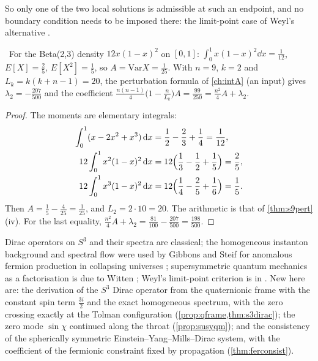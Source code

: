 So only one of the two local solutions is admissible at such an endpoint, and no boundary condition needs to be imposed there: the limit-point case of Weyl's alternative \cite{Weidmann}.

\begin{proposition}\label{prop:ninetynine}\ver\
For the Beta(2,3) density $12x(1-x)^2$ on $[0,1]$: $\int_0^1x(1-x)^2\dd x=\frac1{12}$, $E[X]=\frac25$, $E[X^2]=\frac15$, so $A=\mathrm{Var}X=\frac1{25}$. With $n=9$, $k=2$ and $L_k=k(k+n-1)=20$, the perturbation formula of \cref{ch:intA} (an input) gives $\lambda_2=-\frac{207}{500}$ and the coefficient $\frac{n(n-1)}4\bigl(1-\frac n{L_k}\bigr)A=\frac{99}{250}=\frac{n^2}4A+\lambda_2$.
\end{proposition}
\begin{proof}
The moments are elementary integrals:
\begin{align*}
\int_0^1(x-2x^2+x^3)\,\mathrm{d} x&=\frac12-\frac23+\frac14=\frac1{12},\\
12\int_0^1x^2(1-x)^2\,\mathrm{d} x&=12\Bigl(\frac13-\frac12+\frac15\Bigr)=\frac25,\\
12\int_0^1x^3(1-x)^2\,\mathrm{d} x&=12\Bigl(\frac14-\frac25+\frac16\Bigr)=\frac15 .
\end{align*}
Then $A=\frac15-\frac4{25}=\frac1{25}$, and $L_2=2\cdot10=20$. The arithmetic is that of \cref{thm:s9pert}(iv). For the last equality, $\frac{n^2}4A+\lambda_2=\frac{81}{100}-\frac{207}{500}=\frac{198}{500}$.
\end{proof}


\begin{litbox}
Dirac operators on $S^3$ and their spectra are classical; the homogeneous instanton background and spectral flow were used by Gibbons and Steif for anomalous fermion production in collapsing universes \cite{GibbonsSteif1993}; supersymmetric quantum mechanics as a factorisation is due to Witten \cite{Witten1981}; Weyl's limit-point criterion is in \cite{Weidmann}. New here are: the derivation of the $S^3$ Dirac operator from the quaternionic frame with the constant spin term $\frac{3i}2$ and the exact homogeneous spectrum, with the zero crossing exactly at the Tolman configuration (\cref{prop:qframe,thm:s3dirac}); the zero mode $\sin\chi$ continued along the throat (\cref{prop:susyqm}); and the consistency of the spherically symmetric Einstein--Yang--Mills--Dirac system, with the coefficient of the fermionic constraint fixed by propagation (\cref{thm:ferconsist}).
\end{litbox}

